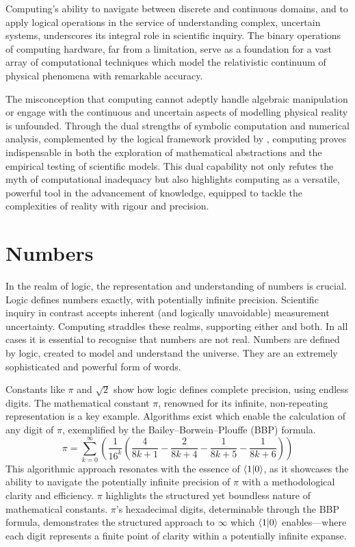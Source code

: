 \documentclass[12pt]{article}
\begin{document}
Computing's ability to navigate between discrete and continuous domains, and to apply logical operations in the service of understanding complex, uncertain systems, underscores its integral role in scientific inquiry. The binary operations of computing hardware, far from a limitation, serve as a foundation for a vast array of computational techniques which model the relativistic continuum of physical phenomena with remarkable accuracy.

The misconception that computing cannot adeptly handle algebraic manipulation or engage with the continuous and uncertain aspects of modelling physical reality is unfounded. Through the dual strengths of symbolic computation and numerical analysis, complemented by the logical framework provided by \iR{}, computing proves indispensable in both the exploration of mathematical abstractions and the empirical testing of scientific models. This dual capability not only refutes the myth of computational inadequacy but also highlights computing as a versatile, powerful tool in the advancement of knowledge, equipped to tackle the complexities of reality with rigour and precision.

\section*{Numbers}

In the realm of logic, the representation and understanding of numbers is crucial. Logic defines numbers exactly, with potentially infinite precision. Scientific inquiry in contrast accepts inherent (and logically unavoidable) measurement uncertainty. Computing straddles these realms, supporting either and both. In all cases it is essential to recognise that numbers are not real. Numbers are defined by logic, created to model and understand the universe. They are an extremely sophisticated and powerful form of words.

Constants like \(\pi\) and \(\sqrt{2}\) show how logic defines complete precision, using endless digits. The mathematical constant \(\pi\), renowned for its infinite, non-repeating representation is a key example. Algorithms exist which enable the calculation of any digit of \(\pi\), exemplified by the Bailey–Borwein–Plouffe (BBP) formula.
\[ \pi = \sum_{k=0}^{\infty} \left( \frac{1}{16^k} \left( \frac{4}{8k + 1} - \frac{2}{8k + 4} - \frac{1}{8k + 5} - \frac{1}{8k + 6} \right) \right) \]
This algorithmic approach resonates with the essence of \(\langle 1 | 0 \rangle\), as it showcases the ability to navigate the potentially infinite precision of \(\pi\) with a methodological clarity and efficiency. \(\pi\) highlights the structured yet boundless nature of mathematical constants. \(\pi\)'s hexadecimal digits, determinable through the BBP formula, demonstrates the structured approach to \(\infty\) which \(\langle 1 | 0 \rangle\) enables—where each digit represents a finite point of clarity within a potentially infinite expanse.
\end{document}
